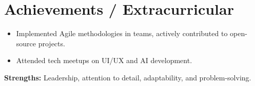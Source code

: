 \documentclass[letterpaper,11pt]{article}
\begin{document}
\section{Achievements / Extracurricular}
\begin{itemize}
    \item Implemented Agile methodologies in teams, actively contributed to open-source projects.
    \item Attended tech meetups on UI/UX and AI development.
\end{itemize}

\textbf{Strengths:} Leadership, attention to detail, adaptability, and problem-solving.
\end{document}
